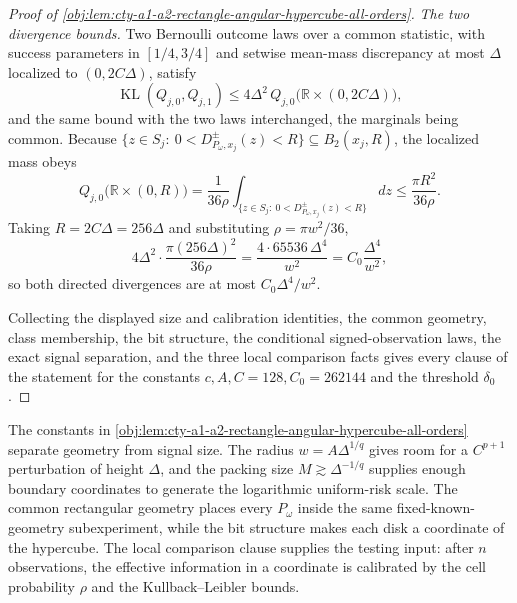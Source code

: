 \documentclass[11pt]{article}
\begin{document}
\begin{proof}[Proof of \cref{obj:lem:cty-a1-a2-rectangle-angular-hypercube-all-orders}]
\emph{The two divergence bounds.}
Two Bernoulli outcome laws over a common statistic, with success parameters in \([1/4,3/4]\) and setwise mean-mass discrepancy at most \(\Delta\) localized to \((0,2C\Delta)\), satisfy
\[
\operatorname{KL}(Q_{j,0},Q_{j,1})
\leq
4\Delta^2\,Q_{j,0}\bigl(\mathbb R\times(0,2C\Delta)\bigr),
\]
and the same bound with the two laws interchanged, the marginals being common.
Because \(\{z\in S_j:\ 0<D^{\pm}_{P_\omega,x_j}(z)<R\}\subseteq B_2(x_j,R)\), the localized mass obeys
\[
Q_{j,0}\bigl(\mathbb R\times(0,R)\bigr)
=
\frac1{36\rho}\int_{\{z\in S_j:\ 0<D^{\pm}_{P_\omega,x_j}(z)<R\}}dz
\leq
\frac{\pi R^2}{36\rho}.
\]
Taking \(R=2C\Delta=256\Delta\) and substituting \(\rho=\pi w^2/36\),
\[
4\Delta^2\cdot\frac{\pi(256\Delta)^2}{36\rho}
=
\frac{4\cdot 65536\,\Delta^4}{w^2}
=
C_0\frac{\Delta^4}{w^2},
\]
so both directed divergences are at most \(C_0\Delta^4/w^2\).

Collecting the displayed size and calibration identities, the common geometry, class membership, the bit structure, the conditional signed-observation laws, the exact signal separation, and the three local comparison facts gives every clause of the statement for the constants \(c,A,C=128,C_0=262144\) and the threshold \(\delta_0\).
\end{proof}

The constants in \cref{obj:lem:cty-a1-a2-rectangle-angular-hypercube-all-orders} separate geometry from signal size. The radius \(w=A\Delta^{1/q}\) gives room for a \(C^{p+1}\) perturbation of height \(\Delta\), and the packing size \(M\gtrsim \Delta^{-1/q}\) supplies enough boundary coordinates to generate the logarithmic uniform-risk scale. The common rectangular geometry places every \(P_\omega\) inside the same fixed-known-geometry subexperiment, while the bit structure makes each disk a coordinate of the hypercube. The local comparison clause supplies the testing input: after \(n\) observations, the effective information in a coordinate is calibrated by the cell probability \(\rho\) and the Kullback--Leibler bounds.
\end{document}
